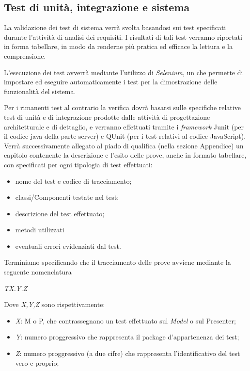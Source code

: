 {\subsection{Test di unità, integrazione e sistema}
La validazione dei test di sistema verrà svolta basandosi sui test specificati durante l'attività di analisi dei requisiti. I risultati di tali test verranno riportati in forma tabellare, in modo da renderne più pratica ed efficace la lettura e la comprensione.

L'esecuzione dei test avverrà mediante l'utilizzo di \textit{Selenium}, un  che permette di impostare ed eseguire automaticamente i test per la dimostrazione delle funzionalità del sistema.

Per i rimanenti test al contrario la verifica dovrà basarsi sulle specifiche relative test di unità e di integrazione prodotte dalle attività di progettazione architetturale e di dettaglio, e verranno effettuati tramite i \textit{framework} Junit (per il codice java della parte server) e QUnit (per i test relativi al codice JavaScript).\\
Verrà successivamente allegato al piado di qualifica (nella sezione Appendice) un capitolo contenente la descrizione e l'esito delle prove, anche in formato tabellare, con specificati per ogni tipologia di test effettuati:
\begin{itemize}
\item nome del test e codice di tracciamento;
\item classi/Componenti testate nel test;
\item descrizione del test effettuato;
\item metodi utilizzati
\item eventuali errori evidenziati dal test.
\end{itemize}

Terminiamo specificando che il tracciamento delle prove avviene mediante la seguente nomenclatura

\begin{center}
\textit{TX.Y.Z}
\end{center}
Dove \textit{X,Y,Z} sono rispettivamente:
\begin{itemize}
\item \textit{X}: M o P, che contrassegnano un test effettuato sul \textit{Model} o sul {Presenter};
\item \textit{Y}: numero proggressivo che rappresenta il package d'appartenenza dei test;
\item \textit{Z}: numero proggressivo (a due cifre) che rappresenta l'identificativo del test vero e proprio;
\end{itemize}


}
